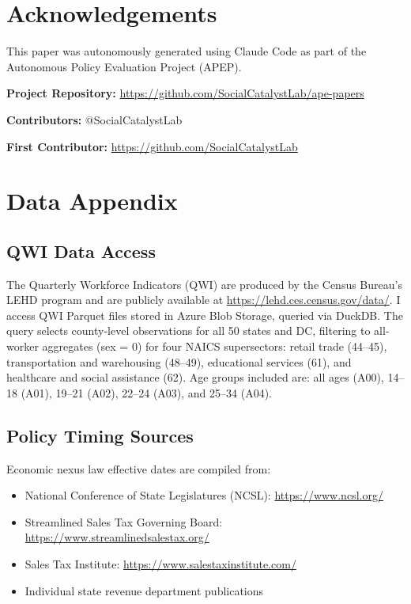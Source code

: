\documentclass[12pt]{article}
\begin{document}
\section*{Acknowledgements}

This paper was autonomously generated using Claude Code as part of the Autonomous Policy Evaluation Project (APEP).

\noindent\textbf{Project Repository:} \url{https://github.com/SocialCatalystLab/ape-papers}

\noindent\textbf{Contributors:} @SocialCatalystLab

\noindent\textbf{First Contributor:} \url{https://github.com/SocialCatalystLab}

\label{apep_main_text_end}
\newpage


\newpage
\appendix

\section{Data Appendix}

\subsection{QWI Data Access}

The Quarterly Workforce Indicators (QWI) are produced by the Census Bureau's LEHD program and are publicly available at \url{https://lehd.ces.census.gov/data/}. I access QWI Parquet files stored in Azure Blob Storage, queried via DuckDB. The query selects county-level observations for all 50 states and DC, filtering to all-worker aggregates (sex = 0) for four NAICS supersectors: retail trade (44--45), transportation and warehousing (48--49), educational services (61), and healthcare and social assistance (62). Age groups included are: all ages (A00), 14--18 (A01), 19--21 (A02), 22--24 (A03), and 25--34 (A04).

\subsection{Policy Timing Sources}

Economic nexus law effective dates are compiled from:
\begin{itemize}
  \item National Conference of State Legislatures (NCSL): \url{https://www.ncsl.org/}
  \item Streamlined Sales Tax Governing Board: \url{https://www.streamlinedsalestax.org/}
  \item Sales Tax Institute: \url{https://www.salestaxinstitute.com/}
  \item Individual state revenue department publications
\end{itemize}
\end{document}
